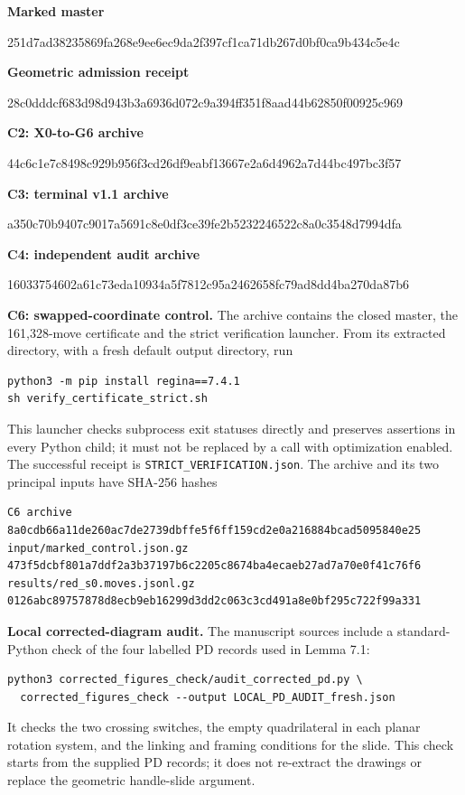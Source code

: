 \documentclass[11pt,letterpaper]{article}
\begin{document}
\smallskip\textbf{Marked master}\par
{\small\ttfamily 251d7ad38235869fa268e9ee6ec9da2f397cf1ca71db267d0bf0ca9b434c5e4c\par}
\smallskip\textbf{Geometric admission receipt}\par
{\small\ttfamily 28c0dddcf683d98d943b3a6936d072c9a394ff351f8aad44b62850f00925c969\par}
\smallskip\textbf{C2: X0-to-G6 archive}\par
{\small\ttfamily 44c6c1e7c8498c929b956f3cd26df9eabf13667e2a6d4962a7d44bc497bc3f57\par}
\smallskip\textbf{C3: terminal v1.1 archive}\par
{\small\ttfamily a350c70b9407c9017a5691c8e0df3ce39fe2b5232246522c8a0c3548d7994dfa\par}
\smallskip\textbf{C4: independent audit archive}\par
{\small\ttfamily 16033754602a61c73eda10934a5f7812c95a2462658fc79ad8dd4ba270da87b6\par}
\smallskip\textbf{C6: swapped-coordinate control.} The archive  contains the closed master, the 161,328-move certificate and the strict verification launcher. From its extracted directory, with a fresh default output directory, run
\begin{Verbatim}
python3 -m pip install regina==7.4.1
sh verify_certificate_strict.sh
\end{Verbatim}
This launcher checks subprocess exit statuses directly and preserves assertions in every Python child; it must not be replaced by a call with optimization enabled. The successful receipt is \texttt{STRICT\_VERIFICATION.json}. The archive and its two principal inputs have SHA-256 hashes
\begin{Verbatim}
C6 archive
8a0cdb66a11de260ac7de2739dbffe5f6ff159cd2e0a216884bcad5095840e25
input/marked_control.json.gz
473f5dcbf801a7ddf2a3b37197b6c2205c8674ba4ecaeb27ad7a70e0f41c76f6
results/red_s0.moves.jsonl.gz
0126abc89757878d8ecb9eb16299d3dd2c063c3cd491a8e0bf295c722f99a331
\end{Verbatim}

\smallskip\textbf{Local corrected-diagram audit.} The manuscript sources include a standard-Python check of the four labelled PD records used in Lemma 7.1:
\begin{Verbatim}
python3 corrected_figures_check/audit_corrected_pd.py \
  corrected_figures_check --output LOCAL_PD_AUDIT_fresh.json
\end{Verbatim}
It checks the two crossing switches, the empty quadrilateral in each planar rotation system, and the linking and framing conditions for the slide. This check starts from the supplied PD records; it does not re-extract the drawings or replace the geometric handle-slide argument.
\end{document}
